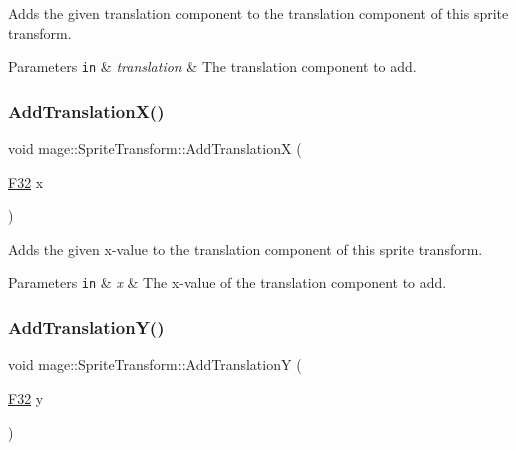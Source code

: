 Adds the given translation component to the translation component of this sprite transform.


\begin{DoxyParams}[1]{Parameters}
\mbox{\tt in}  & {\em translation} & The translation component to add. \\
\hline
\end{DoxyParams}
\hypertarget{structmage_1_1_sprite_transform_a040bd05b911dbe199c3eab6f6811ce5b}{}\label{structmage_1_1_sprite_transform_a040bd05b911dbe199c3eab6f6811ce5b} 
\subsubsection{\texorpdfstring{Add\+Translation\+X()}{AddTranslationX()}}
{\footnotesize\ttfamily void mage\+::\+Sprite\+Transform\+::\+Add\+TranslationX (\begin{DoxyParamCaption}\item[{\hyperlink{namespacemage_aa97e833b45f06d60a0a9c4fc22ae02c0}{F32}}]{x }\end{DoxyParamCaption})\hspace{0.3cm}{\ttfamily [noexcept]}}

Adds the given x-\/value to the translation component of this sprite transform.


\begin{DoxyParams}[1]{Parameters}
\mbox{\tt in}  & {\em x} & The x-\/value of the translation component to add. \\
\hline
\end{DoxyParams}
\hypertarget{structmage_1_1_sprite_transform_ab45b391a7bdc357facd0eb322e0a294f}{}\label{structmage_1_1_sprite_transform_ab45b391a7bdc357facd0eb322e0a294f} 
\subsubsection{\texorpdfstring{Add\+Translation\+Y()}{AddTranslationY()}}
{\footnotesize\ttfamily void mage\+::\+Sprite\+Transform\+::\+Add\+TranslationY (\begin{DoxyParamCaption}\item[{\hyperlink{namespacemage_aa97e833b45f06d60a0a9c4fc22ae02c0}{F32}}]{y }\end{DoxyParamCaption})\hspace{0.3cm}{\ttfamily [noexcept]}}


